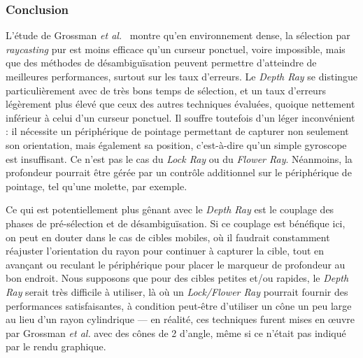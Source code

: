 	\subsubsection{Conclusion}
	L'étude de Grossman \emph{et al.}~\cite{grossman2006design} montre qu'en environnement dense, la sélection par \emph{raycasting} pur est moins efficace qu'un curseur ponctuel, voire impossible, mais que des méthodes de désambiguïsation peuvent permettre d'atteindre de meilleures performances, surtout sur les taux d'erreurs. Le \emph{Depth Ray} se distingue particulièrement avec de très bons temps de sélection, et un taux d'erreurs légèrement plus élevé que ceux des autres techniques évaluées, quoique nettement inférieur à celui d'un curseur ponctuel. Il souffre toutefois d'un léger inconvénient : il nécessite un périphérique de pointage permettant de capturer non seulement son orientation, mais également sa position, c'est-à-dire qu'un simple gyroscope est insuffisant. Ce n'est pas le cas du \emph{Lock Ray} ou du \emph{Flower Ray}. Néanmoins, la profondeur pourrait être gérée par un contrôle additionnel sur le périphérique de pointage, tel qu'une molette, par exemple.
	
	Ce qui est potentiellement plus gênant avec le \emph{Depth Ray} est le couplage des phases de pré-sélection et de désambiguïsation. Si ce couplage est bénéfique ici, on peut en douter dans le cas de cibles mobiles, où il faudrait constamment réajuster l'orientation du rayon pour continuer à \og capturer \fg{} la cible, tout en avançant ou reculant le périphérique pour placer le marqueur de profondeur au bon endroit. Nous supposons que pour des cibles petites et/ou rapides, le \emph{Depth Ray} serait très difficile à utiliser, là où un \emph{Lock/Flower Ray} pourrait fournir des performances satisfaisantes, à condition peut-être d'utiliser un cône un peu large au lieu d'un rayon cylindrique --- en réalité, ces techniques furent mises en \oe{}uvre par Grossman \emph{et al.} avec des cônes de 2\textdegree{} d'angle, même si ce n'était pas indiqué par le rendu graphique.
	
